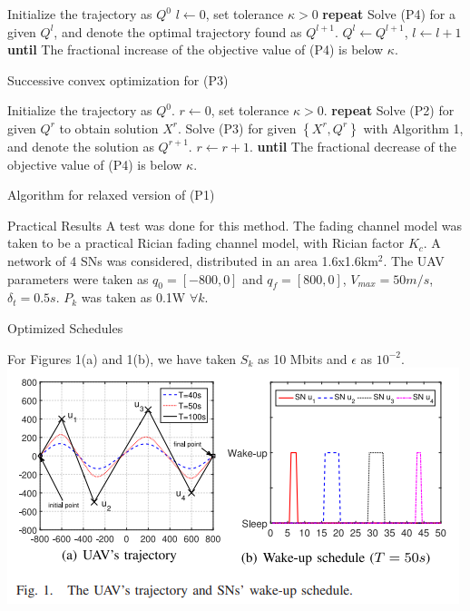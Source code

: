 \documentclass{beamer}
\providecommand{\cbrak}[1]{\ensuremath{\left\{#1\right\}}}
\begin{document}
\begin{frame}
\begin{algorithm}[H]
\begin{algorithmic}[1]
\STATE Initialize the trajectory as $Q^0$
\STATE $l \longleftarrow 0$, set tolerance $\kappa >0$
\STATE \textbf{repeat}
\STATE \quad Solve (P4) for a given $Q^l$, and denote the optimal trajectory found as $Q^{l+1}$. 
\STATE \quad $Q^{l}\longleftarrow Q^{l+1}$, $l \longleftarrow l+1$
\STATE \textbf{until} The fractional increase of the objective value of (P4) is below $\kappa$.

\end{algorithmic}
\caption{Successive convex optimization for (P3)}
\end{algorithm}
\end{frame}
\begin{frame}
\begin{algorithm}[H]
\begin{algorithmic}[1]
\STATE Initialize the trajectory as $Q^0$.
\STATE $r \longleftarrow 0$, set tolerance $\kappa >0$.
\STATE \textbf{repeat}
\STATE \quad Solve (P2) for given $Q^r$ to obtain solution $X^r$. 
\STATE \quad Solve (P3) for given $\cbrak{X^r, Q^r}$ with Algorithm 1, and denote the solution as $Q^{r+1}$.
\STATE $r \longleftarrow r+1$.
\STATE \textbf{until} The fractional decrease of the objective value of (P4) is below $\kappa$.
\end{algorithmic}
\caption{Algorithm for relaxed version of (P1)}
\end{algorithm}
\end{frame}
\begin{frame}{Practical Results}
A test was done for this method. The fading channel model was taken to be a practical Rician fading channel model, with Rician factor $K_c$. A network of 4 SNs was considered, distributed in an area 1.6x1.6km$^2$. The UAV parameters were taken as $q_0=[-800, 0]$ and $q_f=[800, 0]$, $V_{max}=50m/s$, $\delta_t=0.5s$. $P_k$ was taken as 0.1W $\forall k$. 
\end{frame}
\begin{frame}{Optimized Schedules}

For Figures 1(a) and 1(b), we have taken $S_k$ as 10 Mbits and $\epsilon$ as $10^{-2}$.
\includegraphics{fig1.png}

    
\end{frame}
\end{document}
